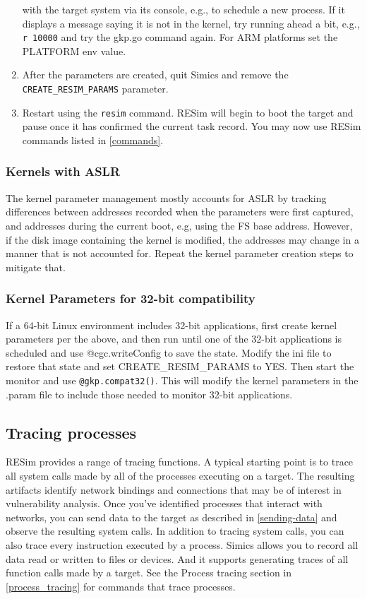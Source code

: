\documentclass[titlepage]{article}
\begin{document}
\begin{enumerate}
with the target system via its console, e.g., to schedule a new process.  If it displays a message saying it is not in the kernel,
try running ahead a bit, e.g., {\tt r 10000} and try the gkp.go command again.  For ARM platforms set the PLATFORM env value. 
\item After the parameters are created, quit Simics and remove the {\tt CREATE\_RESIM\_PARAMS} parameter.
\item Restart using the {\tt resim} command.  RESim will begin to boot the target and pause once it has confirmed the current task record.  You
may now use RESim commands listed in \ref{commands}.
\end{enumerate}

\subsubsection{Kernels with ASLR}
The kernel parameter management mostly accounts for ASLR by tracking differences between addresses recorded when the parameters were first
captured, and addresses during the current boot, e.g, using the FS base address.  However, if the disk image containing the kernel is modified,
the addresses may change in a manner that is not accounted for.  Repeat the kernel parameter creation steps to mitigate that.

\subsubsection{Kernel Parameters for 32-bit compatibility}
If a 64-bit Linux environment includes 32-bit applications, first create kernel parameters per the above, and then run until one of the 32-bit applications
is scheduled and use @cgc.writeConfig to save
the state.  Modify the ini file to restore that state and set CREATE\_RESIM\_PARAMS to YES.  Then start the monitor and use
{\tt @gkp.compat32()}.  This will modify the kernel parameters in the .param file to include those needed to monitor 32-bit applications.

\subsection{Tracing processes}
RESim provides a range of tracing functions.  A typical starting point is to trace all system calls made by all of the processes executing on a target.
The resulting artifacts identify network bindings and connections that may be of interest in vulnerability analysis.  Once you've identified processes
that interact with networks, you can send data to the target as described in \ref{sending-data} and observe the resulting system calls.  In addition to 
tracing system calls, you can also trace every instruction executed by a process. Simics allows you to record all data read or written to files or devices.
And it supports generating traces of all function calls made by a target.  See the Process tracing section in \ref{process_tracing} for commands that trace processes.
\end{document}
